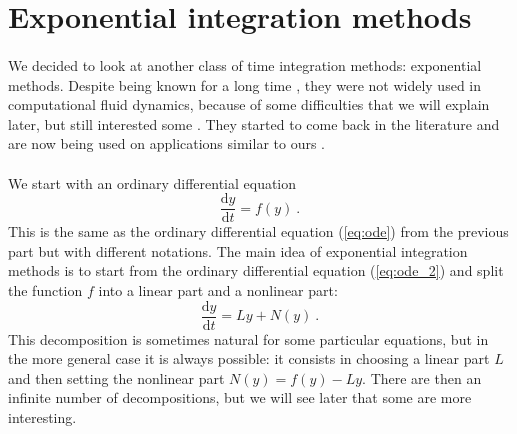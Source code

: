   \section{Exponential integration methods}

    \paragraph{}
    We decided to look at another class of time integration methods: exponential methods.
    Despite being known for a long time \cite{Pope1963}, they were not widely used in computational fluid dynamics, because of some difficulties that we will explain later, but still interested some \cite{EdwardsTuckermanFriesnerEtAl1994}.
    They started to come back in the literature \cite{HochbruckOstermann2005, HochbruckOstermann2010} and are now being used on applications similar to ours \cite{NieZhangZhao2006, BhattKhaliqWade2018}.

    \paragraph{}
    We start with an ordinary differential equation
    \begin{equation}\label{eq:ode_2}
      \frac{\mathrm{d} y}{\mathrm{d} t} = f\left(y\right) \ .
    \end{equation}
    This is the same as the ordinary differential equation (\ref{eq:ode}) from the previous part but with different notations.
    The main idea of exponential integration methods is to start from the ordinary differential equation (\ref{eq:ode_2}) and split the function $f$ into a linear part and a nonlinear part:
    \begin{equation}\label{eq:ode_split}
      \frac{\mathrm{d} y}{\mathrm{d} t} = Ly + N\left(y\right) \ .
    \end{equation}
    This decomposition is sometimes natural for some particular equations, but in the more general case it is always possible: it consists in choosing a linear part $L$ and then setting the nonlinear part $N\left(y\right) = f(y) - Ly$.
    There are then an infinite number of decompositions, but we will see later that some are more interesting.


